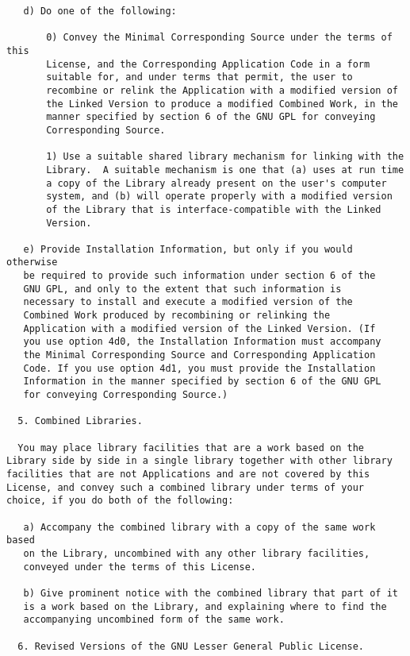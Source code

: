 \documentclass[a4paper]{article}
\begin{document}
\begin{verbatim}
   d) Do one of the following:

       0) Convey the Minimal Corresponding Source under the terms of this
       License, and the Corresponding Application Code in a form
       suitable for, and under terms that permit, the user to
       recombine or relink the Application with a modified version of
       the Linked Version to produce a modified Combined Work, in the
       manner specified by section 6 of the GNU GPL for conveying
       Corresponding Source.

       1) Use a suitable shared library mechanism for linking with the
       Library.  A suitable mechanism is one that (a) uses at run time
       a copy of the Library already present on the user's computer
       system, and (b) will operate properly with a modified version
       of the Library that is interface-compatible with the Linked
       Version.

   e) Provide Installation Information, but only if you would otherwise
   be required to provide such information under section 6 of the
   GNU GPL, and only to the extent that such information is
   necessary to install and execute a modified version of the
   Combined Work produced by recombining or relinking the
   Application with a modified version of the Linked Version. (If
   you use option 4d0, the Installation Information must accompany
   the Minimal Corresponding Source and Corresponding Application
   Code. If you use option 4d1, you must provide the Installation
   Information in the manner specified by section 6 of the GNU GPL
   for conveying Corresponding Source.)

  5. Combined Libraries.

  You may place library facilities that are a work based on the
Library side by side in a single library together with other library
facilities that are not Applications and are not covered by this
License, and convey such a combined library under terms of your
choice, if you do both of the following:

   a) Accompany the combined library with a copy of the same work based
   on the Library, uncombined with any other library facilities,
   conveyed under the terms of this License.

   b) Give prominent notice with the combined library that part of it
   is a work based on the Library, and explaining where to find the
   accompanying uncombined form of the same work.

  6. Revised Versions of the GNU Lesser General Public License.


\end{verbatim}
\end{document}
